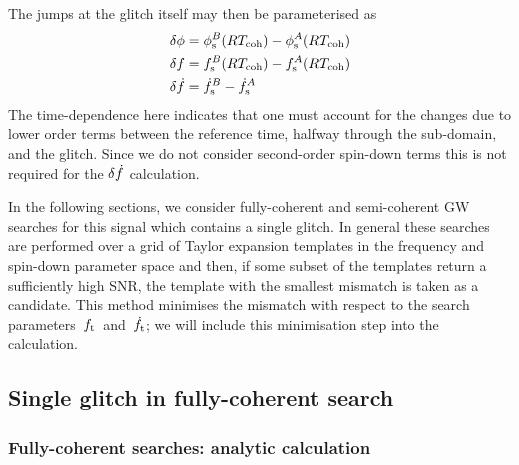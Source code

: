 \documentclass[../full_thesis/full_thesis.tex]{subfiles}
\begin{document}
The jumps at the glitch itself may then be parameterised as
\begin{align}
\begin{split}
\delta\phi & =  \phi_{\textrm{s}}^{B}(RT_{\mathrm{coh}}) - \phi_{\textrm{s}}^{A}(RT_{\mathrm{coh}})\\
\delta f & =  f_{\textrm{s}}^{B}(RT_{\mathrm{coh}}) - f_{\textrm{s}}^{A}(RT_{\mathrm{coh}})\\
\delta\dot{f} & =  \dot{f}_{\textrm{s}}^{B} - \dot{f}_{\textrm{s}}^{A}
\end{split}
\label{eqn: glitch jumps}
\end{align}
The time-dependence here indicates that one must account for the
changes due to lower order terms between the reference time, halfway through
the sub-domain, and the glitch. Since we do not consider second-order spin-down
terms this is not required for the $\delta\dot{f}$ calculation.

In the following sections, we consider fully-coherent and semi-coherent GW
searches for this signal which contains a single glitch. In general these
searches are performed over a grid of Taylor expansion templates in the
frequency and spin-down parameter space and then, if some subset of the
templates return a sufficiently high SNR, the template with the smallest
mismatch is taken as a candidate. This method minimises the mismatch with
respect to the search parameters~${f_{\textrm{t}}}$~and~$\dot{f}_{\textrm{t}}$; we will include this
minimisation step into the calculation.

\subsection{Single glitch in fully-coherent search}

\subsubsection{Fully-coherent searches: analytic calculation}
\end{document}
